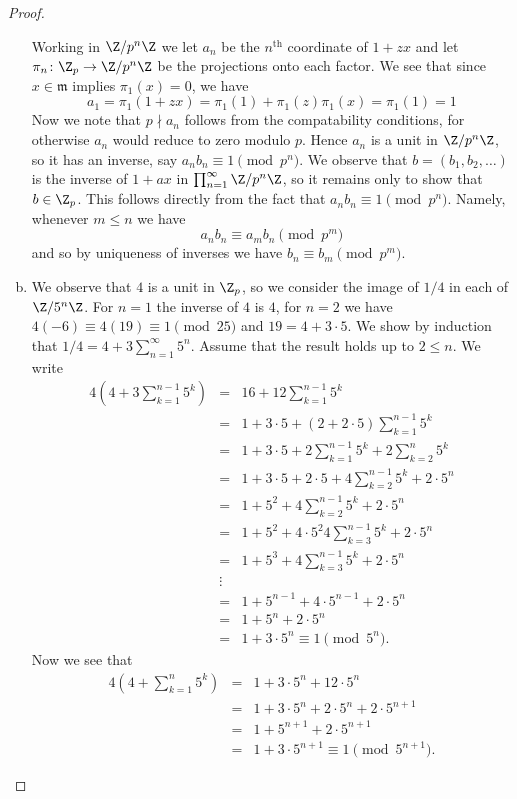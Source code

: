 \documentclass[10pt]{amsart}
\begin{document}
\begin{thm}
\begin{proof}
\begin{enumerate}[(a)]
		Working in $\Z/p^n\Z$ we let $a_n$ be the $n^\text{th}$ coordinate of $1 + zx$ and let $\pi_n \colon \Z_p \rightarrow \Z/p^n\Z$ be the projections onto each factor.
		We see that since $x \in \mathfrak{m}$ implies $\pi_1(x) = 0$, we have
		$$a_1 = \pi_1(1 + zx) = \pi_1(1) + \pi_1(z)\pi_1(x) = \pi_1(1) = 1$$
		Now we note that $p \nmid a_n$ follows from the compatability conditions, for otherwise $a_n$ would reduce to zero modulo $p$.
		Hence $a_n$ is a unit in $\Z/p^n\Z$, so it has an inverse, say $a_nb_n \equiv 1 \pmod{p^n}$.
		We observe that $b = (b_1, b_2, \ldots)$ is the inverse of $1 + ax$ in $\prod_{n=1}^\infty \Z/p^n\Z$, so it remains only to show that $b \in \Z_p$.
		This follows directly from the fact that $a_nb_n \equiv 1 \pmod{p^n}$.
		Namely, whenever $m \leq n$ we have
		$$a_nb_n \equiv a_mb_n \pmod{p^m}$$
		and so by uniqueness of inverses we have $b_n \equiv b_m \pmod{p^m}$.
		\item
		We observe that $4$ is a unit in $\Z_p$, so we consider the image of $1/4$ in each of $\Z/5^n\Z$.
		For $n = 1$ the inverse of $4$ is $4$, for $n = 2$ we have $4(-6) \equiv 4(19) \equiv 1 \pmod 25$ and $19 = 4 + 3\cdot 5$.
		We show by induction that $1/4 = 4 + 3\sum_{n=1}^\infty 5^n$.
		Assume that the result holds up to $2 \leq n$.
		We write
		\begin{eqnarray*}
			4\left(4 + 3\sum_{k=1}^{n-1} 5^k\right) &=&  16 + 12\sum_{k=1}^{n-1} 5^k\\
			&=& 1 + 3\cdot 5 + (2 + 2\cdot 5)\sum_{k=1}^{n-1} 5^k\\
			&=& 1 + 3\cdot 5 + 2\sum_{k=1}^{n-1} 5^k + 2\sum_{k=2}^{n} 5^k\\
			&=& 1 + 3\cdot 5 + 2 \cdot 5 + 4\sum_{k=2}^{n-1} 5^k + 2 \cdot 5^n\\
			&=& 1 + 5^2 + 4\sum_{k=2}^{n-1} 5^k + 2 \cdot 5^n\\
			&=& 1 + 5^2 + 4\cdot 5^2 4\sum_{k=3}^{n-1} 5^k + 2\cdot 5^n\\
			&=& 1 + 5^3 + 4\sum_{k=3}^{n-1} 5^k + 2 \cdot 5^n\\
			&\vdots&\\
			&=& 1 + 5^{n-1} + 4 \cdot 5^{n-1} + 2 \cdot 5^n\\
			&=& 1 + 5^{n} + 2 \cdot 5^{n}\\
			&=& 1 + 3\cdot 5^n \equiv 1 \pmod{5^{n}}.
		\end{eqnarray*}
		Now we see that
		\begin{eqnarray*}
			4\left(4 + \sum_{k=1}^n 5^k\right) &=& 1 + 3\cdot 5^{n} + 12\cdot5^{n}\\
			&=& 1 + 3\cdot 5^{n} + 2\cdot 5^{n} + 2\cdot5^{n+1}\\
			&=& 1 + 5^{n+1} + 2\cdot 5^{n+1}\\
			&=& 1 + 3 \cdot 5^{n+1} \equiv 1 \pmod{5^{n+1}}.
		\end{eqnarray*}


\end{enumerate}
\end{proof}
\end{thm}
\end{document}
